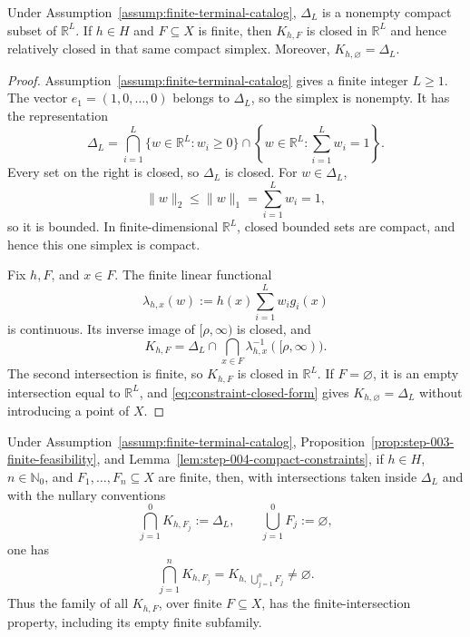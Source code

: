 \begin{lemma}
\label{lem:step-004-compact-constraints}
Under Assumption~\ref{assump:finite-terminal-catalog}, $\Delta_L$ is a
nonempty compact subset of $\mathbb R^L$.  If $h\in H$ and
$F\subseteq X$ is finite, then $K_{h,F}$ is closed in $\mathbb R^L$ and
hence relatively closed in that same compact simplex.  Moreover,
$K_{h,\varnothing}=\Delta_L$.
\end{lemma}

\begin{proof}
Assumption~\ref{assump:finite-terminal-catalog} gives a finite integer
$L\ge1$.  The vector $e_1=(1,0,\ldots,0)$ belongs to $\Delta_L$, so the
simplex is nonempty.  It has the representation
\begin{equation}\label{eq:simplex-closed-form}
\Delta_L
=\bigcap_{i=1}^L\{w\in\mathbb R^L:w_i\ge0\}
\cap\left\{w\in\mathbb R^L:\sum_{i=1}^Lw_i=1\right\}.
\end{equation}
Every set on the right is closed, so $\Delta_L$ is closed.  For
$w\in\Delta_L$,
\[
\lVert w\rVert_2\le\lVert w\rVert_1
=\sum_{i=1}^Lw_i=1,
\]
so it is bounded.  In finite-dimensional $\mathbb R^L$, closed bounded sets
are compact, and hence this one simplex is compact.

Fix $h,F$, and $x\in F$.  The finite linear functional
\[
\lambda_{h,x}(w):=h(x)\sum_{i=1}^Lw_i g_i(x)
\]
is continuous.  Its inverse image of $[\rho,\infty)$ is closed, and
\begin{equation}\label{eq:constraint-closed-form}
K_{h,F}=\Delta_L\cap
\bigcap_{x\in F}\lambda_{h,x}^{-1}([\rho,\infty)).
\end{equation}
The second intersection is finite, so $K_{h,F}$ is closed in
$\mathbb R^L$.  If $F=\varnothing$, it is an empty intersection equal to
$\mathbb R^L$, and \eqref{eq:constraint-closed-form} gives
$K_{h,\varnothing}=\Delta_L$ without introducing a point of $X$.
\end{proof}

\begin{proposition}
\label{prop:step-004-exact-fip}
Under Assumption~\ref{assump:finite-terminal-catalog},
Proposition~\ref{prop:step-003-finite-feasibility}, and
Lemma~\ref{lem:step-004-compact-constraints}, if $h\in H$,
$n\in\mathbb N_0$, and $F_1,\ldots,F_n\subseteq X$ are finite, then,
with intersections taken inside $\Delta_L$ and with the nullary conventions
\[
\bigcap_{j=1}^0K_{h,F_j}:=\Delta_L,
\qquad
\bigcup_{j=1}^0F_j:=\varnothing,
\]
one has
\begin{equation}\label{eq:exact-finite-intersection}
\bigcap_{j=1}^nK_{h,F_j}
=K_{h,\,\bigcup_{j=1}^nF_j}\ne\varnothing.
\end{equation}
Thus the family of all $K_{h,F}$, over finite $F\subseteq X$, has the
finite-intersection property, including its empty finite subfamily.
\end{proposition}

